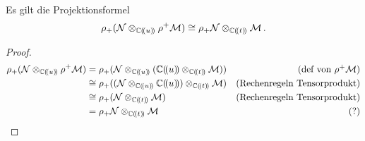 \begin{thm} \label{thm:Projektionsformel}
\cite[1.a]{sabbah_Fourier-local}
Es gilt die Projektionsformel
\begin{equation} \label{eq:Projektionsformel}
\rho_+(\mathcal{N}\otimes_{\mathbb{C}(\!(u)\!)}\rho^+\mathcal{M}) \cong
\rho_+\mathcal{N}\otimes_{\mathbb{C}(\!(t)\!)}\mathcal{M}\,.
\end{equation}
\end{thm}
\begin{proof}
\begin{align*}
\rho_+(\cN\otimes_{\C(\!(u)\!)}\rho^+\cM) &=
\rho_+(\cN\otimes_{\C(\!(u)\!)}(\C(\!(u)\!)\otimes_{\C(\!(t)\!)}\cM)) 
  & \mbox{(def von $\rho^+\cM$)}\\
&\cong \rho_+((\cN\otimes_{\C(\!(u)\!)}\C(\!(u)\!))
\otimes_{\C(\!(t)\!)}\cM) 
  & \mbox{(Rechenregeln Tensorprodukt)}\\ %
&\cong \rho_+(\cN\otimes_{\C(\!(t)\!)}\cM) 
  & \mbox{(Rechenregeln Tensorprodukt)}\\
&= \rho_+\cN\otimes_{\C(\!(t)\!)}\cM 
  & \mbox{(?)}
\end{align*}
\end{proof}

\begin{comment}
Sei $\rho(u)=u^p=t$ und $\phi(t)$ gegeben.
\begin{align*}
\rho^+\sE^{\phi(t)}&=\sE^{\phi(\rho(u))}=\sE^{\phi(u^p)}\\
\rho^+\rho_+\sE^{\phi(u)}
&=\underset{\zeta\in\mu_p}{\bigoplus}\sE^{\phi(\zeta\cdot u)}\\
\end{align*}
\end{comment}

